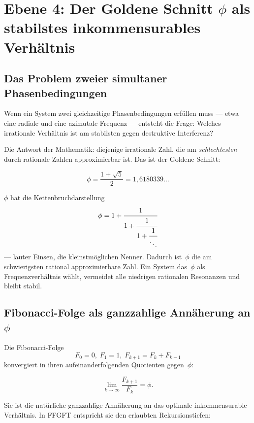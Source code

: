 \section{Ebene 4: Der Goldene Schnitt $\phi$ als stabilstes
         inkommensurables Verhältnis}

\subsection{Das Problem zweier simultaner Phasenbedingungen}

Wenn ein System zwei gleichzeitige Phasenbedingungen erfüllen muss —
etwa eine radiale und eine azimutale Frequenz — entsteht die Frage:
Welches irrationale Verhältnis ist am stabilsten gegen destruktive
Interferenz?

Die Antwort der Mathematik: diejenige irrationale Zahl, die am
\emph{schlechtesten} durch rationale Zahlen approximierbar ist.
Das ist der Goldene Schnitt:

\begin{equation}
  \phi = \frac{1 + \sqrt{5}}{2} = 1{,}6180339\ldots
\end{equation}

\begin{keybox}
$\phi$ hat die Kettenbruchdarstellung
\[
  \phi = 1 + \cfrac{1}{1 + \cfrac{1}{1 + \cfrac{1}{\ddots}}}
\]
— lauter Einsen, die kleinstmöglichen Nenner. Dadurch ist~$\phi$ die
am schwierigsten rational approximierbare Zahl. Ein System das~$\phi$
als Frequenzverhältnis wählt, vermeidet alle niedrigen rationalen
Resonanzen und bleibt stabil.
\end{keybox}

\subsection{Fibonacci-Folge als ganzzahlige Annäherung an $\phi$}

Die Fibonacci-Folge
\begin{equation}
  F_0 = 0,\; F_1 = 1,\; F_{k+1} = F_k + F_{k-1}
\end{equation}
konvergiert in ihren aufeinanderfolgenden Quotienten gegen~$\phi$:

\begin{equation}
  \lim_{k \to \infty} \frac{F_{k+1}}{F_k} = \phi.
\end{equation}

Sie ist die natürliche ganzzahlige Annäherung an das optimale
inkommensurable Verhältnis. In FFGFT entspricht sie den erlaubten
Rekursionstiefen:

